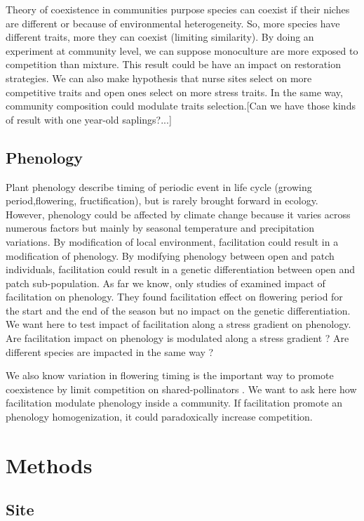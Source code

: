 \documentclass[12pt]{article} %
\begin{document}
Theory of coexistence in communities purpose species can coexist if their niches are different or because of environmental heterogeneity. So, more species have different traits, more they can coexist (limiting similarity). By doing an experiment at community level, we can suppose monoculture are more exposed to competition than mixture. This result could be have an impact on restoration strategies. We can also make hypothesis that nurse sites select on more competitive traits and open ones select on more stress traits. In the same way, community composition could modulate traits selection.[Can we have those kinds of result with one year-old saplings?...]

\subsection{Phenology}
Plant phenology describe timing of periodic event in life cycle (growing period,flowering, fructification), but is rarely brought forward in ecology.
However, phenology could be affected by climate change \citep{Cleland2007} because it varies across numerous factors but mainly by seasonal temperature and precipitation variations. By modification of local environment, facilitation could result in a modification of phenology. By modifying phenology between open and patch individuals, facilitation could result in a genetic differentiation between open and patch sub-population. As far we know, only studies of \citet{Castellanos2014} examined impact of facilitation on phenology. They found facilitation effect on flowering period for the start and the end of the season but no impact on the genetic differentiation. We want here to test impact of facilitation along a stress gradient on phenology. Are facilitation impact on phenology is modulated along a stress gradient ? Are different species are impacted in the same way ?

We also know variation in flowering timing is the important way to promote coexistence by limit competition on shared-pollinators \citep{Cleland2006}. We want to ask here how facilitation modulate phenology inside a community. If facilitation promote an phenology homogenization, it could paradoxically increase competition. 


\section{Methods}

\subsection{Site}
\end{document}
